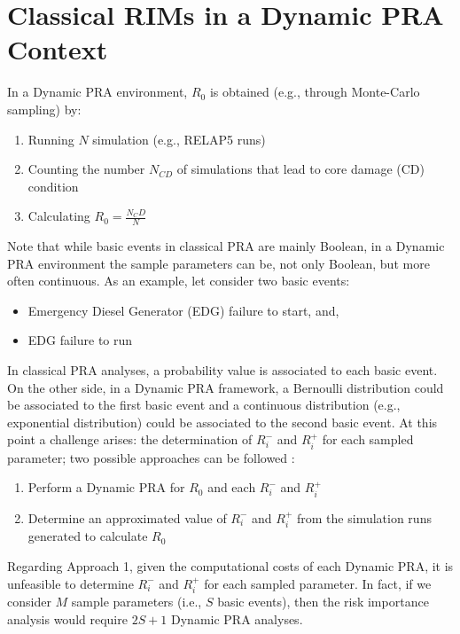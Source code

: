 \section{Classical RIMs in a Dynamic PRA Context}
\label{sec:classicalRIMs_RISMC}

In a Dynamic PRA environment, $R_0$ is obtained (e.g., through Monte-Carlo sampling) by:
\begin{enumerate}
  \item Running $N$ simulation (e.g., RELAP5 runs)
  \item Counting the number $N_{CD}$ of simulations that lead to core damage (CD) condition
  \item Calculating $R_0= \frac{N_CD}{N}$
\end{enumerate}
Note that while basic events in classical PRA are mainly Boolean, in a Dynamic PRA environment the 
sample parameters can be, not only Boolean, but more often continuous. As an example, let consider
two basic events:
\begin{itemize}
  \item Emergency Diesel Generator (EDG) failure to start, and, 
  \item EDG failure to run
\end{itemize}

In classical PRA analyses, a probability value is associated to each basic event. On the other side, 
in a Dynamic PRA framework, a Bernoulli distribution could be associated to the first basic event and 
a continuous distribution (e.g., exponential distribution) could be associated to the second basic event. 
At this point a challenge arises: the determination of $R_i^-$ and $R_i^+$ for each sampled parameter; 
two possible approaches can be followed :
\begin{enumerate}
  \item Perform a Dynamic PRA for $R_0$ and each $R_i^-$ and $R_i^+$
  \item Determine an approximated value of $R_i^-$ and $R_i^+$ from the simulation runs generated to calculate $R_0$
\end{enumerate}
Regarding Approach 1, given the computational costs of each Dynamic PRA, it is unfeasible to determine 
$R_i^-$ and $R_i^+$ for each sampled parameter. In fact, if we consider $M$ sample
parameters (i.e., $S$ basic events), then the risk importance analysis would require $2S+1$ Dynamic PRA analyses.

